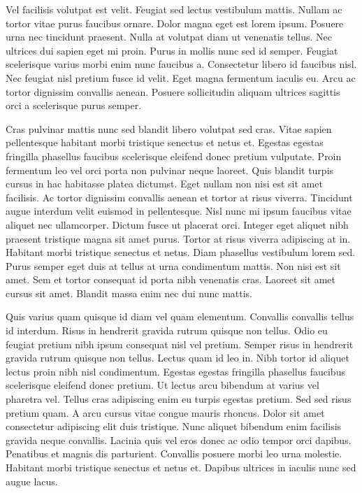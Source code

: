 \documentclass[11pt,a4paper]{article}
\begin{document}
Vel facilisis volutpat est velit. Feugiat sed lectus vestibulum mattis. Nullam ac tortor vitae purus faucibus ornare. Dolor magna eget est lorem ipsum. Posuere urna nec tincidunt praesent. Nulla at volutpat diam ut venenatis tellus. Nec ultrices dui sapien eget mi proin. Purus in mollis nunc sed id semper. Feugiat scelerisque varius morbi enim nunc faucibus a. Consectetur libero id faucibus nisl. Nec feugiat nisl pretium fusce id velit. Eget magna fermentum iaculis eu. Arcu ac tortor dignissim convallis aenean. Posuere sollicitudin aliquam ultrices sagittis orci a scelerisque purus semper.

Cras pulvinar mattis nunc sed blandit libero volutpat sed cras. Vitae sapien pellentesque habitant morbi tristique senectus et netus et. Egestas egestas fringilla phasellus faucibus scelerisque eleifend donec pretium vulputate. Proin fermentum leo vel orci porta non pulvinar neque laoreet. Quis blandit turpis cursus in hac habitasse platea dictumst. Eget nullam non nisi est sit amet facilisis. Ac tortor dignissim convallis aenean et tortor at risus viverra. Tincidunt augue interdum velit euismod in pellentesque. Nisl nunc mi ipsum faucibus vitae aliquet nec ullamcorper. Dictum fusce ut placerat orci. Integer eget aliquet nibh praesent tristique magna sit amet purus. Tortor at risus viverra adipiscing at in. Habitant morbi tristique senectus et netus. Diam phasellus vestibulum lorem sed. Purus semper eget duis at tellus at urna condimentum mattis. Non nisi est sit amet. Sem et tortor consequat id porta nibh venenatis cras. Laoreet sit amet cursus sit amet. Blandit massa enim nec dui nunc mattis.

Quis varius quam quisque id diam vel quam elementum. Convallis convallis tellus id interdum. Risus in hendrerit gravida rutrum quisque non tellus. Odio eu feugiat pretium nibh ipsum consequat nisl vel pretium. Semper risus in hendrerit gravida rutrum quisque non tellus. Lectus quam id leo in. Nibh tortor id aliquet lectus proin nibh nisl condimentum. Egestas egestas fringilla phasellus faucibus scelerisque eleifend donec pretium. Ut lectus arcu bibendum at varius vel pharetra vel. Tellus cras adipiscing enim eu turpis egestas pretium. Sed sed risus pretium quam. A arcu cursus vitae congue mauris rhoncus. Dolor sit amet consectetur adipiscing elit duis tristique. Nunc aliquet bibendum enim facilisis gravida neque convallis. Lacinia quis vel eros donec ac odio tempor orci dapibus. Penatibus et magnis dis parturient. Convallis posuere morbi leo urna molestie. Habitant morbi tristique senectus et netus et. Dapibus ultrices in iaculis nunc sed augue lacus.
\end{document}
